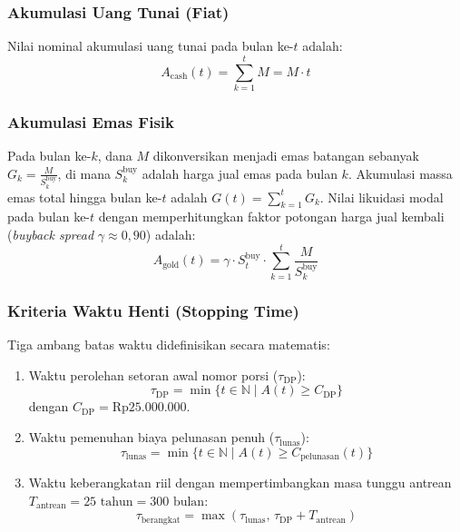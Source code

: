 \documentclass[journal,twoside]{IEEEtran}
\begin{document}
\subsubsection{Akumulasi Uang Tunai (Fiat)}
Nilai nominal akumulasi uang tunai pada bulan ke-$t$ adalah:
\begin{equation}
A_{\text{cash}}(t) = \sum_{k=1}^t M = M \cdot t \label{eq:accum_cash}
\end{equation}

\subsubsection{Akumulasi Emas Fisik}
Pada bulan ke-$k$, dana $M$ dikonversikan menjadi emas batangan sebanyak $G_k = \frac{M}{S_k^{\text{buy}}}$, di mana $S_k^{\text{buy}}$ adalah harga jual emas pada bulan $k$. Akumulasi massa emas total hingga bulan ke-$t$ adalah $G(t) = \sum_{k=1}^t G_k$. Nilai likuidasi modal pada bulan ke-$t$ dengan memperhitungkan faktor potongan harga jual kembali (\textit{buyback spread} $\gamma \approx 0{,}90$) adalah:
\begin{equation}
A_{\text{gold}}(t) = \gamma \cdot S_t^{\text{buy}} \cdot \sum_{k=1}^t \frac{M}{S_k^{\text{buy}}} \label{eq:accum_gold}
\end{equation}

\subsubsection{Kriteria Waktu Henti (Stopping Time)}
Tiga ambang batas waktu didefinisikan secara matematis:
\begin{enumerate}
    \item Waktu perolehan setoran awal nomor porsi ($\tau_{\text{DP}}$):
    \begin{equation}
    \tau_{\text{DP}} = \min \{ t \in \mathbb{N} \mid A(t) \ge C_{\text{DP}} \}
    \end{equation}
    dengan $C_{\text{DP}} = \text{Rp}25.000.000$.
    \item Waktu pemenuhan biaya pelunasan penuh ($\tau_{\text{lunas}}$):
    \begin{equation}
    \tau_{\text{lunas}} = \min \{ t \in \mathbb{N} \mid A(t) \ge C_{\text{pelunasan}}(t) \}
    \end{equation}
    \item Waktu keberangkatan riil dengan mempertimbangkan masa tunggu antrean $T_{\text{antrean}} = 25 \text{ tahun} = 300 \text{ bulan}$:
    \begin{equation}
    \tau_{\text{berangkat}} = \max\left( \tau_{\text{lunas}}, \, \tau_{\text{DP}} + T_{\text{antrean}} \right)
    \end{equation}
\end{enumerate}
\end{document}
